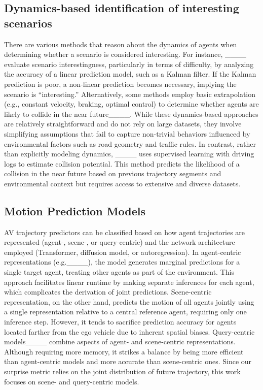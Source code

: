 \subsection{Dynamics-based identification of interesting scenarios}
There are various methods that reason about the dynamics of agents when determining whether a scenario is considered interesting. For instance, ____ evaluate scenario interestingness, particularly in terms of difficulty, by analyzing the accuracy of a linear prediction model, such as a Kalman filter. If the Kalman prediction is poor, a non-linear prediction becomes necessary, implying the scenario is ``interesting.'' Alternatively, some methods employ basic extrapolation (e.g., constant velocity, braking, optimal control) to determine whether agents are likely to collide in the near future____.
While these dynamics-based approaches are relatively straightforward and do not rely on large datasets, they involve simplifying assumptions that fail to capture non-trivial behaviors influenced by environmental factors such as road geometry and traffic rules. In contrast, rather than explicitly modeling dynamics, ____ uses supervised learning with driving logs to estimate collision potential. This method predicts the likelihood of a collision in the near future based on previous trajectory segments and environmental context but requires access to extensive and diverse datasets.

\subsection{Motion Prediction Models}
AV trajectory predictors can be classified based on how agent trajectories are represented (agent-, scene-, or query-centric) and the network architecture employed (Transformer, diffusion model, or autoregression). In agent-centric representations (e.g.____), the model generates marginal predictions for a single target agent, treating other agents as part of the environment. This approach facilitates linear runtime by making separate inferences for each agent, which complicates the derivation of joint predictions. Scene-centric representation, on the other hand, predicts the motion of all agents jointly using a single representation relative to a central reference agent, requiring only one inference step. However, it tends to sacrifice prediction accuracy for agents located farther from the ego vehicle due to inherent spatial biases. Query-centric models____ combine aspects of agent- and scene-centric representations. Although requiring more memory, it strikes a balance by being more efficient than agent-centric models and more accurate than scene-centric ones. Since our surprise metric relies on the joint distribution of future trajectory, this work focuses on scene- and query-centric models.

